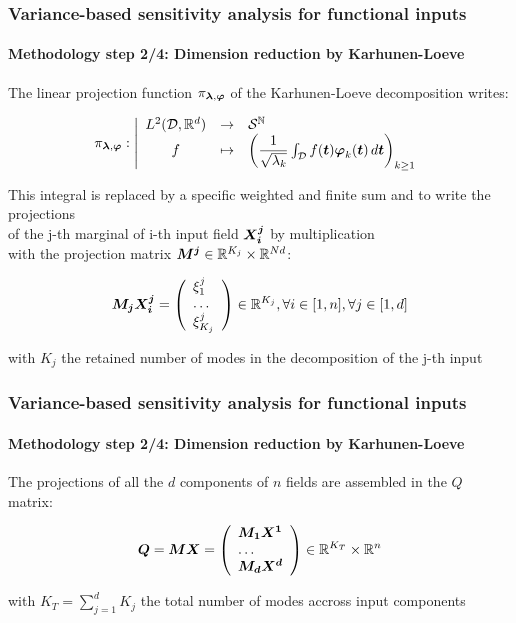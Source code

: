 \documentclass[aspectratio=169]{beamer}
\begin{document}
\begin{frame}
\frametitle{Variance-based sensitivity analysis for functional inputs}

\framesubtitle{Methodology step 2/4: Dimension reduction by Karhunen-Loeve}

The linear projection function $\pi_{ {\mathbf{\boldsymbol{{\lambda}}}}, {\mathbf{\boldsymbol{{\varphi}}}}}$ of
the Karhunen-Loeve decomposition writes:

$$
    \pi_{{\mathbf{\boldsymbol{{\lambda}}}}, {\mathbf{\boldsymbol{{\varphi}}}}}: \left|
      \begin{array}{ccl}
        L^2({\mathcal D}, \mathbb{R}^d) & \rightarrow & {\mathcal S}^{{\mathbb N}} \\
        f & \mapsto &\left(\dfrac{1}{\sqrt{\lambda_k}}\int_{{\mathcal D}}f({\mathbf{\boldsymbol{{t}}}}) {\mathbf{\boldsymbol{{\varphi}}}}_k({\mathbf{\boldsymbol{{t}}}})\, d{\mathbf{\boldsymbol{{t}}}}\right)_{k \geq 1}
      \end{array}
    \right.
$$

This integral is replaced by a specific weighted and finite sum and to write the projections\\
of the j-th marginal of i-th input field ${\mathbf{\boldsymbol{{X_i^j}}}}$ by multiplication\\
with the projection matrix ${{\mathbf{\boldsymbol{{{\mathbf{\boldsymbol{{M^j}}}}}}}}} \in \mathbb{R}^{K_j} \times \mathbb{R}^{Nd}$:

$$
    {{\mathbf{\boldsymbol{{{\mathbf{\boldsymbol{{M_j}}}}}}}}} {\mathbf{\boldsymbol{{X_i^j}}}} = \left( \begin{array}{l} \xi_1^j \\ \dots \\ \xi_{K_j}^j \end{array} \right)
    \in \mathbb{R}^{K_j}, \forall i \in [1, n], \forall j \in [1, d]
$$

with $K_j$ the retained number of modes in the decomposition of the j-th input

\end{frame}

\begin{frame}
\frametitle{Variance-based sensitivity analysis for functional inputs}

\framesubtitle{Methodology step 2/4: Dimension reduction by Karhunen-Loeve}

The projections of all the $d$ components of $n$ fields are assembled in the $Q$ matrix:

$$
        {{\mathbf{\boldsymbol{{{\mathbf{\boldsymbol{{Q}}}}}}}}} = {{\mathbf{\boldsymbol{{{\mathbf{\boldsymbol{{M}}}}}}}}} {{\mathbf{\boldsymbol{{{\mathbf{\boldsymbol{{X}}}}}}}}} =
        \left(
          \begin{array}{l}
            {{\mathbf{\boldsymbol{{{\mathbf{\boldsymbol{{M_1}}}}}}}}} {{\mathbf{\boldsymbol{{{\mathbf{\boldsymbol{{X^1}}}}}}}}} \\
            \dots \\
            {{\mathbf{\boldsymbol{{{\mathbf{\boldsymbol{{M_d}}}}}}}}} {{\mathbf{\boldsymbol{{{\mathbf{\boldsymbol{{X^d}}}}}}}}}
          \end{array}
        \right) \in \mathbb{R}^{K_T} \times \mathbb{R}^n
$$

with $K_T = \sum_{j=1}^d{K_j}$ the total number of modes accross input components

\end{frame}
\end{document}
